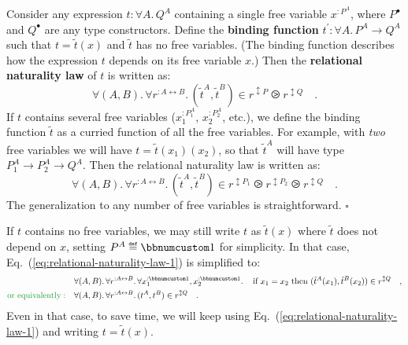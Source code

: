 Consider any expression $t:\forall A.\,Q^{A}$ containing a single
free variable $x^{:P^{A}}$, where $P^{\bullet}$
and $Q^{\bullet}$ are any type constructors. Define the \textbf{binding
function} $t^{\prime}:\forall A.\,P^{A}\rightarrow Q^{A}$ such that
$t=\tilde{t}(x)$ and $\tilde{t}$ has no free variables. (The binding
function describes how the expression $t$ depends on its free variable
$x$.) Then the \textbf{relational naturality law}
of $t$ is written as:
\begin{equation}
\forall(A,B).\,\forall r^{:A\leftrightarrow B}.\,(\tilde{t}^{A},\tilde{t}^{B})\in r^{\updownarrow P}\ogreaterthan r^{\updownarrow Q}\quad.\label{eq:relational-naturality-law-1}
\end{equation}
If $t$ contains several free variables ($x_{1}^{:P_{1}^{A}}$, $x_{2}^{:P_{2}^{A}}$,
etc.), we define the binding function $\tilde{t}$ as a curried function
of all the free variables. For example, with \emph{two} free variables
we will have $t=\tilde{t}(x_{1})(x_{2})$, so that $\tilde{t}^{A}$
will have type $P_{1}^{A}\rightarrow P_{2}^{A}\rightarrow Q^{A}$.
Then the relational naturality law is written as:
\begin{equation}
\forall(A,B).\,\forall r^{:A\leftrightarrow B}.\,(\tilde{t}^{A},\tilde{t}^{B})\in r^{\updownarrow P_{1}}\ogreaterthan r^{\updownarrow P_{2}}\ogreaterthan r^{\updownarrow Q}\quad.\label{eq:relational-naturality-law-two-free-vars}
\end{equation}
The generalization to any number of free variables is straightforward.
$\square$

If $t$ contains no free variables, we may still write $t$ as $\tilde{t}(x)$
where $\tilde{t}$ does not depend on $x$, setting $P^{A}\triangleq\bbnum 1$
for simplicity. In that case, Eq.~(\ref{eq:relational-naturality-law-1})
is simplified to:
\begin{align}
 & \forall(A,B).\,\forall r^{:A\leftrightarrow B}.\,\forall x_{1}^{:\bbnum 1},x_{2}^{:\bbnum 1}.\,\quad\text{if }x_{1}=x_{2}\text{ then }(\tilde{t}^{A}(x_{1}),\tilde{t}^{B}(x_{2}))\in r^{\updownarrow Q}\quad,\nonumber \\
{\color{greenunder}\text{or equivalently}:}\quad & \forall(A,B).\,\forall r^{:A\leftrightarrow B}.\,(t^{A},t^{B})\in r^{\updownarrow Q}\quad.\label{eq:relational-naturality-law-simplified}
\end{align}
Even in that case, to save time, we will keep using Eq.~(\ref{eq:relational-naturality-law-1})
and writing $t=\tilde{t}(x)$.

